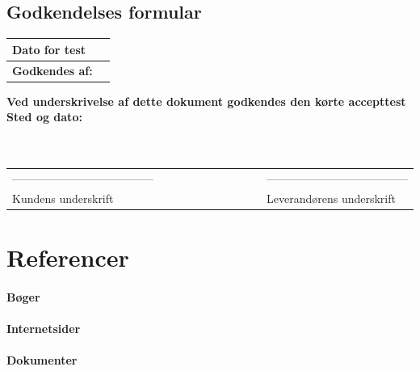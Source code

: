 \section{Godkendelses formular}
\begin{table}[h!]
\label{tab:tabel19}
\begin{tabular}{| l | >{\raggedright\arraybackslash}p{12cm} |}
   \hline
   \textbf{Dato for test} &\\ \hline
   \textbf{Godkendes af:} & \\ \hline
\end{tabular}
\end{table}
\textbf{Ved underskrivelse af dette dokument godkendes den kørte accepttest}
\newline
\textbf{Sted og dato:}\\
\\
\\
\begin{table}
[h!]
\begin{tabular}{ l lllllllll l}
--------------------------------------&&&&&&&&&&--------------------------------------\\ 
Kundens underskrift &&&&&&&&&&Leverandørens underskrift\\
\end{tabular}
\end{table}

\chapter{Referencer}
\subsubsection{Bøger}
\subsubsection{Internetsider}
\subsubsection{Dokumenter}
